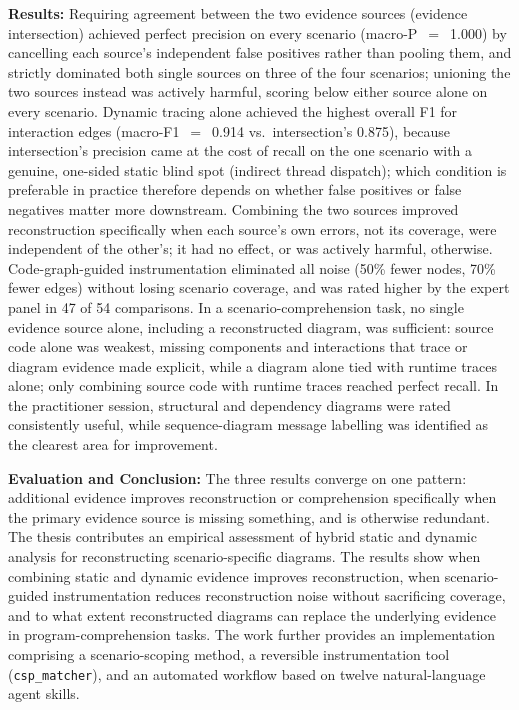 \textbf{Results:} Requiring agreement between the two evidence sources
(evidence intersection) achieved perfect precision on every scenario
(macro-P~$=$~1.000) by cancelling each source's independent false
positives rather than pooling them, and strictly dominated both single
sources on three of the four scenarios; unioning the two sources
instead was actively harmful, scoring below either source alone on every
scenario. Dynamic tracing alone achieved the highest overall F1 for
interaction edges (macro-F1~$=$~0.914 vs.\ intersection's 0.875), because
intersection's precision came at the cost of recall on the one scenario
with a genuine, one-sided static blind spot (indirect thread dispatch);
which condition is preferable in practice therefore depends on whether
false positives or false negatives matter more downstream. Combining the
two sources improved reconstruction specifically when each source's own
errors, not its coverage, were independent of the other's; it had no
effect, or was actively harmful, otherwise. Code-graph-guided
instrumentation eliminated all noise (50\%
fewer nodes, 70\% fewer edges) without losing scenario coverage, and was
rated higher by the expert panel in 47 of 54 comparisons. In a
scenario-comprehension task, no single evidence source alone, including a
reconstructed diagram, was sufficient: source code alone was weakest,
missing components and interactions that trace or diagram evidence made
explicit, while a diagram alone tied with runtime traces alone; only
combining source code with runtime traces reached perfect recall. In the
practitioner session, structural and dependency diagrams were rated
consistently useful, while sequence-diagram message labelling was
identified as the clearest area for improvement.

\textbf{Evaluation and Conclusion:} The three results converge on one
pattern: additional evidence improves reconstruction or comprehension
specifically when the primary evidence source is missing something, and
is otherwise redundant. The thesis contributes an empirical assessment of
hybrid static and dynamic analysis for reconstructing scenario-specific
\sysml diagrams. The results show when combining static and dynamic
evidence improves reconstruction, when scenario-guided instrumentation
reduces reconstruction noise without sacrificing coverage, and to what
extent reconstructed diagrams can replace the underlying evidence in
program-comprehension tasks. The work further provides an implementation
comprising a scenario-scoping method, a reversible instrumentation tool
(\texttt{csp\_matcher}), and an automated workflow based on twelve
natural-language agent skills.

